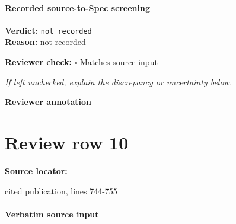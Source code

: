 \documentclass[10pt]{article}
\newcommand{\reviewerbox}{%
  \par\noindent\fbox{\parbox{0.96\linewidth}{\rule{0pt}{0.38in}}}\par
}
\newcommand{\reviewmatch}[1]{%
  \par\noindent\textbf{Reviewer check:} $\square$\; #1\par
  \noindent\emph{If left unchecked, explain the discrepancy or uncertainty below.}\par
}
\begin{document}
\paragraph{Recorded source-to-Spec screening}
\textbf{Verdict:} \texttt{not recorded}
\\
\textbf{Reason:} not recorded
\reviewmatch{Matches source input}
\noindent\textbf{Reviewer annotation}\par
\reviewerbox
\clearpage
\hypertarget{source-claim-4662dc8e8bb960d7}{}
\section*{Review row 10}
\textbf{Source locator:} {\footnotesize\raggedright cited publication, lines 744-\allowbreak{}755\par}
\paragraph{Verbatim source input}
\end{document}
